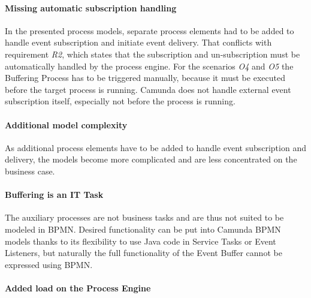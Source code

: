 

\paragraph{Missing automatic subscription handling\newline}

In the presented process models, separate process elements had to be added to handle event subscription and initiate event delivery. 
That conflicts with requirement \textit{R2}, which states that the subscription and un-subscription must be automatically handled by the process engine.
For the scenarios \textit{O4} and \textit{O5} the Buffering Process has to be triggered manually, because it must be executed before the target process is running. Camunda does not handle external event subscription itself, especially not before the process is running.

\paragraph{Additional model complexity\newline}

As additional process elements have to be added to handle event subscription and delivery, the models become more complicated and are less concentrated on the business case.

\paragraph{Buffering is an IT Task\newline}

The auxiliary processes are not business tasks and are thus not suited to be modeled in BPMN.
Desired functionality can be put into Camunda BPMN models thanks to its flexibility to use Java code in Service Tasks or Event Listeners, but naturally the full functionality of the Event Buffer cannot be expressed using BPMN.

\paragraph{Added load on the Process Engine\newline}

